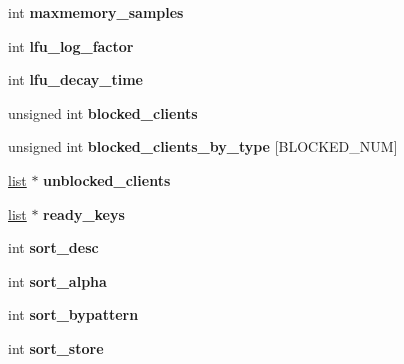 \begin{DoxyCompactItemize}
\item 
\mbox{\label{structredisServer_a239ef47478e345cb6323b1a35a9e4753}} 
int {\bfseries maxmemory\+\_\+samples}
\item 
\mbox{\label{structredisServer_a46d1038b76afb523ddc638d017d017f9}} 
int {\bfseries lfu\+\_\+log\+\_\+factor}
\item 
\mbox{\label{structredisServer_ab034f33149c94c13f0353792f3224b0d}} 
int {\bfseries lfu\+\_\+decay\+\_\+time}
\item 
\mbox{\label{structredisServer_a30c11e437227673c7ccdb1bc68a1ac94}} 
unsigned int {\bfseries blocked\+\_\+clients}
\item 
\mbox{\label{structredisServer_a1acd8236b212b370b44ef3d5d0d74cd4}} 
unsigned int {\bfseries blocked\+\_\+clients\+\_\+by\+\_\+type} \mbox{[}B\+L\+O\+C\+K\+E\+D\+\_\+\+N\+UM\mbox{]}
\item 
\mbox{\label{structredisServer_a0d0abff88ddc7c66f8ce92650dc029e3}} 
\hyperlink{structlist}{list} $\ast$ {\bfseries unblocked\+\_\+clients}
\item 
\mbox{\label{structredisServer_a52e3b0632e3939a0bfaba1a9fea780b6}} 
\hyperlink{structlist}{list} $\ast$ {\bfseries ready\+\_\+keys}
\item 
\mbox{\label{structredisServer_a62c48c84feb7d446d1f283b9dfeabb71}} 
int {\bfseries sort\+\_\+desc}
\item 
\mbox{\label{structredisServer_a760b1484100d293580ffafeab87b4f78}} 
int {\bfseries sort\+\_\+alpha}
\item 
\mbox{\label{structredisServer_aa61e00801374bbdcafe8851a1267afb1}} 
int {\bfseries sort\+\_\+bypattern}
\item 
\mbox{\label{structredisServer_a8d6ddc24168f6707911773149ffd5063}} 
int {\bfseries sort\+\_\+store}
\item 
\mbox{\label{structredisServer_aab054f06652810d6bbd3ebf7f03e2fe8}} 

\end{DoxyCompactItemize}
